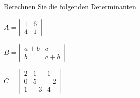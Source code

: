 Berechnen Sie die folgenden Determinanten
\begin{teilaufgaben}
\item $A=\left|\,\begin{matrix}1&6\\4&1\end{matrix}\,\right|$
\item $B=\left|\,\begin{matrix}a+b&a\\b&a+b\end{matrix}\,\right|$
\item $C=\left|\,\begin{matrix}2&1&1\\0&5&-2\\1&-3&4\end{matrix}\,\right|$
\end{teilaufgaben}

